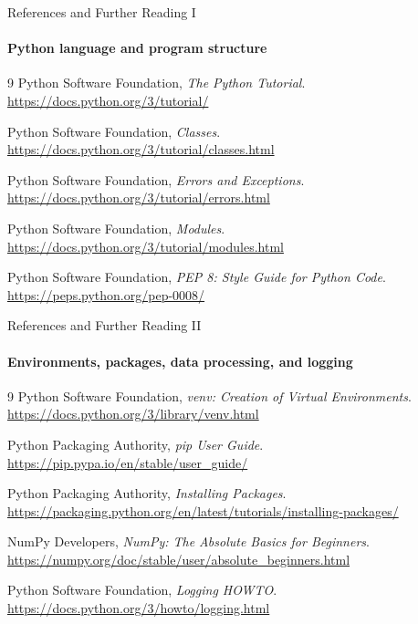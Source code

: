 \begin{frame}{References and Further Reading I}
\framesubtitle{Python language and program structure}
\scriptsize
\begin{thebibliography}{9}
Python Software Foundation, \emph{The Python Tutorial}.\\
\url{https://docs.python.org/3/tutorial/}

Python Software Foundation, \emph{Classes}.\\
\url{https://docs.python.org/3/tutorial/classes.html}

Python Software Foundation, \emph{Errors and Exceptions}.\\
\url{https://docs.python.org/3/tutorial/errors.html}

Python Software Foundation, \emph{Modules}.\\
\url{https://docs.python.org/3/tutorial/modules.html}

Python Software Foundation, \emph{PEP 8: Style Guide for Python Code}.\\
\url{https://peps.python.org/pep-0008/}
\end{thebibliography}
\end{frame}

\begin{frame}{References and Further Reading II}
\framesubtitle{Environments, packages, data processing, and logging}
\scriptsize
\begin{thebibliography}{9}
Python Software Foundation, \emph{venv: Creation of Virtual Environments}.\\
\url{https://docs.python.org/3/library/venv.html}

Python Packaging Authority, \emph{pip User Guide}.\\
\url{https://pip.pypa.io/en/stable/user_guide/}

Python Packaging Authority, \emph{Installing Packages}.\\
\url{https://packaging.python.org/en/latest/tutorials/installing-packages/}

NumPy Developers, \emph{NumPy: The Absolute Basics for Beginners}.\\
\url{https://numpy.org/doc/stable/user/absolute_beginners.html}

Python Software Foundation, \emph{Logging HOWTO}.\\
\url{https://docs.python.org/3/howto/logging.html}
\end{thebibliography}
\end{frame}